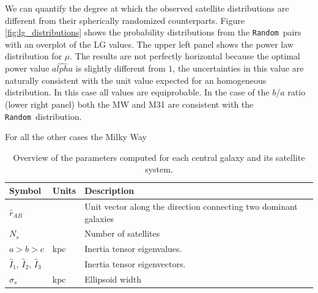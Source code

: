 \documentclass[a4paper,fleqn,usenatbib]{mnras}
\newcommand{\rand}{\texttt{Random}}
\begin{document}
We can quantify the degree at which the observed satellite distributions are 
different from their spherically randomized counterparts.
Figure \ref{fig:lg_distributions} shows the probability distributions
from the \rand\ pairs with an overplot of the LG values.
The upper left panel shows the power law distribution for $\mu$. The
results are not perfectly horizontal because the optimal power value
$\hat{alpha}$ is slightly different from $1$, the uncertainties in
this value are naturally consistent with the unit value expected for
an homogeneous distribution. 
In this case all values are equiprobable.
In the case of the $b/a$ ratio (lower right panel) both the MW and M31
are consistent with the \rand\ distribution.

For all the other cases the Milky Way 









\begin{table}
  \centering
\begin{tabular}{lll}
\hline\hline
Symbol & Units & Description\\\hline
$\hat{r}_{AB}$& & Unit vector along the direction connecting two
dominant galaxies\\
$N_s$ & & Number of satellites\\
$a > b> c$ & kpc & Inertia tensor eigenvalues. \\
$\hat{I}_1$, $\hat{I}_2$, $\hat{I}_3$ & & Inertia tensor eigenvectors. \\
$\sigma_s$ & kpc & Ellipsoid width\\
\hline\hline
\end{tabular}
  \caption{Overview of the parameters computed for each central galaxy
    and its satellite system.
  \label{tab:models}}
\end{table}








\end{document}
